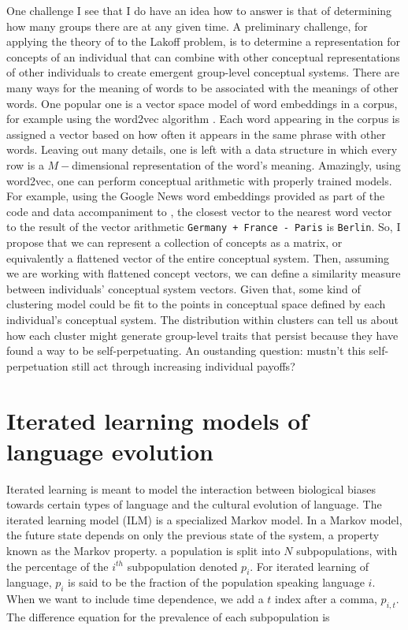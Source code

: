 \documentclass[11pt,letterpaper]{article}
\begin{document}
One challenge I see that I do have an idea how to answer is that of determining
how many groups there are at any given time. A preliminary challenge, for
applying the theory of  to the Lakoff problem, is to
determine a representation for concepts of an individual that can combine with 
other conceptual representations of other individuals to create 
emergent group-level conceptual systems. There are many ways for the meaning
of words to be associated with the meanings of other words. One popular
one is a vector space model of word embeddings in a corpus, for example
using the word2vec algorithm \cite{Mikolov2013a}. Each word appearing in
the corpus is assigned a vector based on how often it appears in the same
phrase with other words. Leaving out many details, one is left with a data
structure in which every row is a $M-$dimensional representation of the
word's meaning. Amazingly, using word2vec, one can perform conceptual 
arithmetic with properly trained models. For example, using the Google News
word embeddings provided as part of the code and data accompaniment to 
, the closest vector to the nearest word vector to the 
result of the vector arithmetic \texttt{Germany + France - Paris} is  
\texttt{Berlin}. So, I propose that we can represent a collection of concepts
as a matrix, or equivalently a flattened vector of the entire conceptual system. 
Then, assuming we are working with flattened concept vectors, we can define
a similarity measure between individuals' conceptual system vectors. Given
that, some kind of clustering model could be fit to the
points in conceptual space defined by each individual's conceptual system. 
The distribution within clusters can tell us about how each cluster might
generate group-level traits that persist because they have found a way to
be self-perpetuating. An oustanding question: mustn't this self-perpetuation
still act through increasing individual payoffs?

\section{Iterated learning models of language evolution}

Iterated learning is meant to model the interaction between biological 
biases towards certain types of language and the cultural evolution of
language. 
The iterated learning model (ILM) is a specialized Markov model. In a Markov
model, the future state depends on only the previous state of the system, 
a property known as the Markov property. 
a population is split into $N$ subpopulations,
with the percentage of the $i^{th}$ subpopulation denoted $p_i$. For iterated
learning of language, $p_i$ is said to be the fraction of the population
speaking language $i$. When we want
to include time dependence, we add a $t$ index after a comma, $p_{i,t}$.
The difference equation for the prevalence of each subpopulation is
\end{document}
